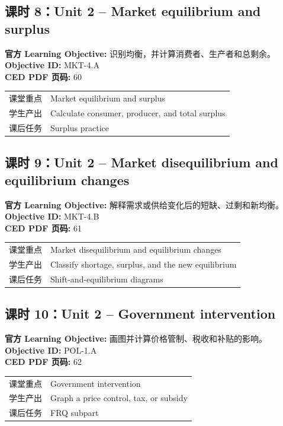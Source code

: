 \documentclass[11pt,a4paper]{ctexart}
\newcommand{\objectivebox}[1]{\noindent\colorbox{aplight}{\parbox{0.96\textwidth}{#1}}}
\begin{document}
\subsection{课时 8：Unit 2 -- Market equilibrium and surplus}
\objectivebox{\textbf{官方 Learning Objective:} 识别均衡，并计算消费者、生产者和总剩余。\\\textbf{Objective ID:} MKT-4.A\\\textbf{CED PDF 页码:} 60}\par\vspace{0.4em}
\begin{tabularx}{\textwidth}{p{3.0cm}Y}
\toprule
课堂重点 & Market equilibrium and surplus\\
学生产出 & Calculate consumer, producer, and total surplus\\
课后任务 & Surplus practice\\
\bottomrule
\end{tabularx}
\subsection{课时 9：Unit 2 -- Market disequilibrium and equilibrium changes}
\objectivebox{\textbf{官方 Learning Objective:} 解释需求或供给变化后的短缺、过剩和新均衡。\\\textbf{Objective ID:} MKT-4.B\\\textbf{CED PDF 页码:} 61}\par\vspace{0.4em}
\begin{tabularx}{\textwidth}{p{3.0cm}Y}
\toprule
课堂重点 & Market disequilibrium and equilibrium changes\\
学生产出 & Classify shortage, surplus, and the new equilibrium\\
课后任务 & Shift-and-equilibrium diagrams\\
\bottomrule
\end{tabularx}
\subsection{课时 10：Unit 2 -- Government intervention}
\objectivebox{\textbf{官方 Learning Objective:} 画图并计算价格管制、税收和补贴的影响。\\\textbf{Objective ID:} POL-1.A\\\textbf{CED PDF 页码:} 62}\par\vspace{0.4em}
\begin{tabularx}{\textwidth}{p{3.0cm}Y}
\toprule
课堂重点 & Government intervention\\
学生产出 & Graph a price control, tax, or subsidy\\
课后任务 & FRQ subpart\\
\bottomrule
\end{tabularx}
\end{document}
